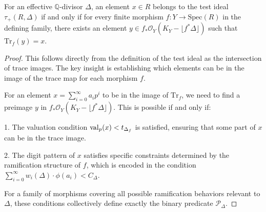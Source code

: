 \begin{theorem}\label{thm:trace-map-characterization}
For an effective $\mathbb{Q}$-divisor $\Delta$, an element $x \in R$ belongs to the test ideal $\tau_+(R,\Delta)$ if and only if for every finite morphism $f: Y \to \text{Spec}(R)$ in the defining family, there exists an element $y \in f_*\mathcal{O}_Y(K_Y - \lfloor f^*\Delta\rfloor)$ such that $\text{Tr}_f(y) = x$.
\end{theorem}

\begin{proof}
This follows directly from the definition of the test ideal as the intersection of trace images. The key insight is establishing which elements can be in the image of the trace map for each morphism $f$.

For an element $x = \sum_{i=0}^{\infty} a_i p^i$ to be in the image of $\text{Tr}_f$, we need to find a preimage $y$ in $f_*\mathcal{O}_Y(K_Y - \lfloor f^*\Delta\rfloor)$. This is possible if and only if:

1. The valuation condition $\operatorname{val}_p(x) < t_{\Delta_f}$ is satisfied, ensuring that some part of $x$ can be in the trace image.

2. The digit pattern of $x$ satisfies specific constraints determined by the ramification structure of $f$, which is encoded in the condition $\sum_{i=0}^{\infty} w_i(\Delta) \cdot \phi(a_i) < C_{\Delta}$.

For a family of morphisms covering all possible ramification behaviors relevant to $\Delta$, these conditions collectively define exactly the binary predicate $\mathcal{P}_\Delta$.
\end{proof}

